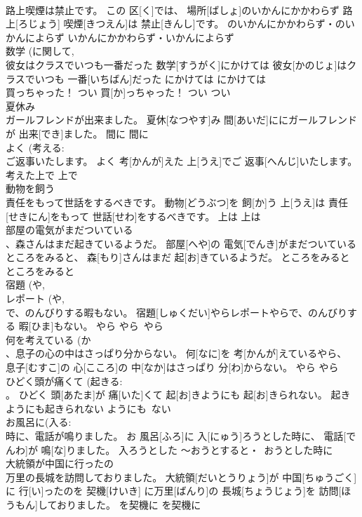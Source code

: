\documentclass[8pt]{extreport}
\begin{document}
\begin{CJK}{UTF8}{min}
\\	路上喫煙は禁止です。	この 区[く]では、 場所[ばしょ]のいかんにかかわらず 路上[ろじょう] 喫煙[きつえん]は 禁止[きんし]です。	のいかんにかかわらず・のいかんによらず	いかんにかかわらず・いかんによらず	
\\	数学 (に関して, 
\\	彼女はクラスでいつも一番だった	数学[すうがく]にかけては 彼女[かのじょ]はクラスでいつも 一番[いちばん]だった	にかけては	にかけては	
\\	買っちゃった！	つい 買[か]っちゃった！	つい	つい~	
\\	夏休み 
\\	ガールフレンドが出来ました。	夏休[なつやす]み 間[あいだ]ににガールフレンドが 出来[でき]ました。	間に	間に	
\\	よく (考える: 
\\	ご返事いたします。	よく 考[かんが]えた 上[うえ]でご 返事[へんじ]いたします。	考えた上で	上で	
\\	動物を飼う 
\\	責任をもって世話をするべきです。	動物[どうぶつ]を 飼[か]う 上[うえ]は 責任[せきにん]をもって 世話[せわ]をするべきです。	上は	上は	
\\	部屋の電気がまだついている 
\\	、森さんはまだ起きているようだ。	部屋[へや]の 電気[でんき]がまだついているところをみると、 森[もり]さんはまだ 起[お]きているようだ。	ところをみると	ところをみると	
\\	宿題 (や, 
\\	レポート (や, 
\\	で、のんびりする暇もない。	宿題[しゅくだい]やらレポートやらで、のんびりする 暇[ひま]もない。	やら	やら~やら	
\\	何を考えている (か 
\\	、息子の心の中はさっぱり分からない。	何[なに]を 考[かんが]えているやら、 息子[むすこ]の 心[こころ]の 中[なか]はさっぱり 分[わ]からない。	やら	やら	
\\	ひどく頭が痛くて (起きる: 
\\	。	ひどく 頭[あたま]が 痛[いた]くて 起[お]きようにも 起[お]きられない。	起きようにも起きられない	ようにも~ない	
\\	お風呂に(入る: 
\\	時に、電話が鳴りました。	お 風呂[ふろ]に 入[にゅう]ろうとした時に、 電話[でんわ]が 鳴[な]りました。	入ろうとした	～おうとすると・~おうとした時に	
\\	大統領が中国に行ったの 
\\	万里の長城を訪問しておりました。	大統領[だいとうりょう]が 中国[ちゅうごく]に 行[い]ったのを 契機[けいき] に万里[ばんり]の 長城[ちょうじょう]を 訪問[ほうもん]しておりました。	を契機に	を契機に	

\end{CJK}
\end{document}
